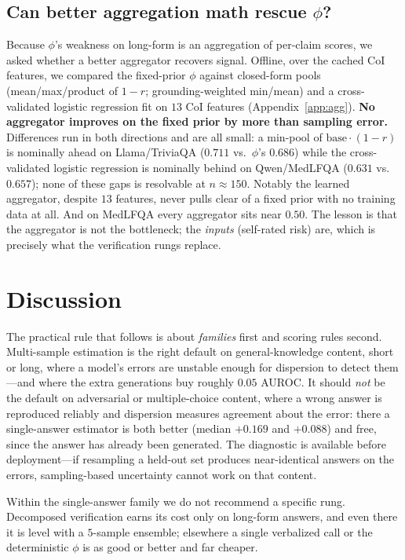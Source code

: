 \documentclass[11pt]{article}
\begin{document}
\subsection{Can better aggregation math rescue $\phi$?}
Because $\phi$'s weakness on long-form is an aggregation of per-claim scores, we asked
whether a better aggregator recovers signal. Offline, over the cached CoI features, we
compared the fixed-prior $\phi$ against closed-form pools (mean/max/product of
$1{-}r$; grounding-weighted min/mean) and a cross-validated logistic regression fit on
$13$ CoI features (Appendix~\ref{app:agg}). \textbf{No aggregator improves on the fixed prior
by more than sampling error.} Differences run in both directions and are all small:
a min-pool of $\mathrm{base}\cdot(1{-}r)$ is nominally ahead on Llama/TriviaQA ($0.711$ vs.\
$\phi$'s $0.686$) while the cross-validated logistic regression is nominally behind on
Qwen/MedLFQA ($0.631$ vs.\ $0.657$); none of these gaps is resolvable at $n{\approx}150$.
Notably the learned aggregator, despite $13$ features, never pulls clear of a fixed prior with
no training data at all. And on MedLFQA every aggregator sits near $0.50$. The lesson is that
the aggregator is not the bottleneck; the \emph{inputs} (self-rated risk) are, which is
precisely what the verification rungs replace.

\section{Discussion}\label{sec:discussion}
The practical rule that follows is about \emph{families} first and scoring rules second.
Multi-sample estimation is the right default on general-knowledge content, short or long, where a
model's errors are unstable enough for dispersion to detect them---and where the extra
generations buy roughly $0.05$ AUROC. It should \emph{not} be the default on adversarial or
multiple-choice content, where a wrong answer is reproduced reliably and dispersion measures
agreement about the error: there a single-answer estimator is both better (median $+0.169$ and
$+0.088$) and free, since the answer has already been generated. The diagnostic is available
before deployment---if resampling a held-out set produces near-identical answers on the errors,
sampling-based uncertainty cannot work on that content.

Within the single-answer family we do not recommend a specific rung. Decomposed verification
earns its cost only on long-form answers, and even there it is level with a $5$-sample ensemble;
elsewhere a single verbalized call or the deterministic $\phi$ is as good or better and far
cheaper.
\end{document}

